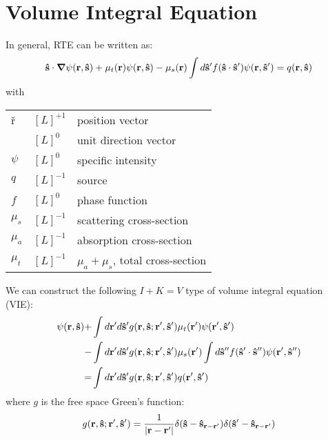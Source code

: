 \documentclass[main]{subfiles}
\begin{document}
\section{Volume Integral Equation}
\label{sec:2d volume integral equation}

In general, RTE can be written as:
\begin{equation*}
	\mathbf{\hat{s}}\cdot\mbox{\boldmath$ \nabla $} \psi(\mathbf{r},\mathbf{\hat{s}})
	+\mu_t(\mathbf{r})\psi(\mathbf{r},\mathbf{\hat{s}})
	-\mu_s(\mathbf{r})\int d\mathbf{\hat{s}}^\prime
	f(\mathbf{\hat{s}}\cdot\mathbf{\hat{s}}^{\prime})\psi(\mathbf{r},\mathbf{\hat{s}}^{\prime})
	=q(\mathbf{r},\mathbf{\hat{s}})
\end{equation*}
with
\begin{center} \begin{tabular}{lll}
	\v{r}	&	$[L]^{+1}$	& position vector		\\
	\uv{s}	&	$[L]^{0}$	& unit direction vector		\\
	$\psi$	&	$[L]^{0}$	& specific intensity		\\
	$q$	&	$[L]^{-1}$	& source			\\
	$f$	&	$[L]^{0}$	& phase function		\\
	$\mu_s$	&	$[L]^{-1}$	& scattering cross-section	\\
	$\mu_a$	&	$[L]^{-1}$	& absorption cross-section	\\
	$\mu_t$	&	$[L]^{-1}$	& $\mu_a+\mu_s$, total cross-section	\\
\end{tabular} \end{center}

We can construct the following $I+K=V$ type of volume integral equation (VIE):
\begin{equation} \label{vie}
	\begin{split}
		\psi(\mathbf{r},\mathbf{\hat{s}}) +& \int d\mathbf{r}^{\prime} d\mathbf{\hat{s}}^{\prime}
		g(\mathbf{r},\mathbf{\hat{s}};\mathbf{r}^{\prime},\mathbf{\hat{s}}^{\prime})
		\mu_t(\mathbf{r}^{\prime})\psi(\mathbf{r}^{\prime},\mathbf{\hat{s}}^{\prime})
		\\
		-& \int d\mathbf{r}^{\prime} d\mathbf{\hat{s}}^{\prime} g(\mathbf{r},\mathbf{\hat{s}};\mathbf{r}^{\prime},\mathbf{\hat{s}}^{\prime})
		\mu_s(\mathbf{r}^{\prime}) \int d\mathbf{\hat{s}}^{{\prime\prime}}
		f(\mathbf{\hat{s}}^{\prime}\cdot\mathbf{\hat{s}}^{{\prime\prime}})\psi(\mathbf{r}^{\prime},\mathbf{\hat{s}}^{{\prime\prime}})
		\\
		=& \int d\mathbf{r}^{\prime} d\mathbf{\hat{s}}^{\prime}
		g(\mathbf{r},\mathbf{\hat{s}};\mathbf{r}^{\prime},\mathbf{\hat{s}}^{\prime})q(\mathbf{r}^{\prime},\mathbf{\hat{s}}^{\prime})
	\end{split}
\end{equation}
where $g$ is the free space Green's function:
\begin{equation} \label{g}
	g(\mathbf{r},\mathbf{\hat{s}};\mathbf{r}^{\prime},\mathbf{\hat{s}}^{\prime}) = \frac{1}{\left| \mathbf{r}-\mathbf{r}^{\prime} \right|} 
	\delta(\mathbf{\hat{s}}-\mathbf{\hat{s}}_{\mathbf{r}-\mathbf{r}^{\prime}})
	\delta(\mathbf{\hat{s}}^{\prime}-\mathbf{\hat{s}}_{\mathbf{r}-\mathbf{r}^{\prime}})
\end{equation}
\end{document}
